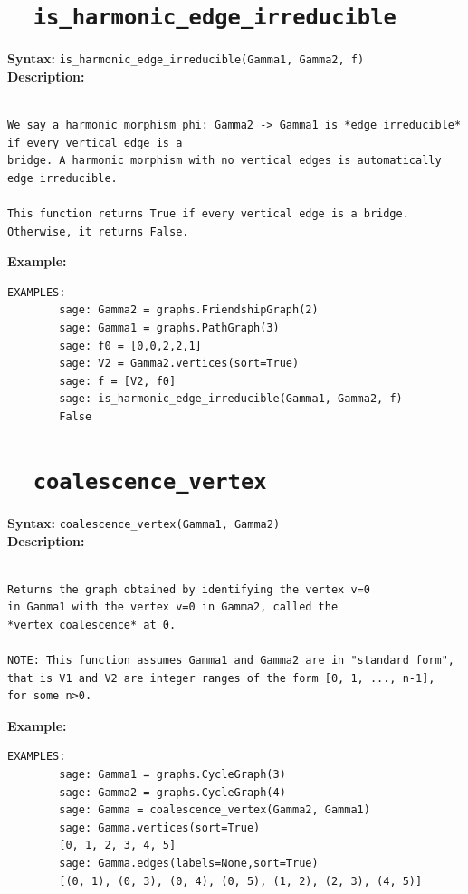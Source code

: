 \documentclass{article}
\begin{document}
\section{\tt \ \ is\_harmonic\_edge\_irreducible}

\textbf{Syntax:} \verb}is_harmonic_edge_irreducible(Gamma1, Gamma2, f)}\\

\textbf{Description:}
\begin{verbatim}

We say a harmonic morphism phi: Gamma2 -> Gamma1 is *edge irreducible* if every vertical edge is a
bridge. A harmonic morphism with no vertical edges is automatically edge irreducible.

This function returns True if every vertical edge is a bridge. Otherwise, it returns False.
\end{verbatim}

\textbf{Example:}
\begin{verbatim}
EXAMPLES:
        sage: Gamma2 = graphs.FriendshipGraph(2)
        sage: Gamma1 = graphs.PathGraph(3)
        sage: f0 = [0,0,2,2,1] 
        sage: V2 = Gamma2.vertices(sort=True) 
        sage: f = [V2, f0]  
        sage: is_harmonic_edge_irreducible(Gamma1, Gamma2, f) 
        False
\end{verbatim}

\section{\tt \ \ coalescence\_vertex}

\textbf{Syntax:} \verb}coalescence_vertex(Gamma1, Gamma2)}\\

\textbf{Description:}
\begin{verbatim}

Returns the graph obtained by identifying the vertex v=0
in Gamma1 with the vertex v=0 in Gamma2, called the 
*vertex coalescence* at 0.

NOTE: This function assumes Gamma1 and Gamma2 are in "standard form",
that is V1 and V2 are integer ranges of the form [0, 1, ..., n-1],
for some n>0.
\end{verbatim}

\textbf{Example:}
\begin{verbatim}
EXAMPLES:
        sage: Gamma1 = graphs.CycleGraph(3)                                                       
        sage: Gamma2 = graphs.CycleGraph(4)                                                       
        sage: Gamma = coalescence_vertex(Gamma2, Gamma1)                                       
        sage: Gamma.vertices(sort=True)                                                                    
        [0, 1, 2, 3, 4, 5]
        sage: Gamma.edges(labels=None,sort=True)                                                            
        [(0, 1), (0, 3), (0, 4), (0, 5), (1, 2), (2, 3), (4, 5)]
\end{verbatim}
\end{document}
